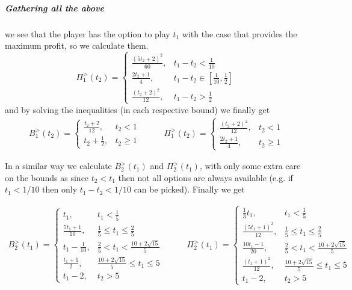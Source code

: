 \documentclass[a4paper,11pt]{article}
\begin{document}
\subparagraph{Gathering all the above} we see that the player has the option to play $t_1$ with the case that provides the maximum profit, so we calculate them.
\[
	\Pi_1^>(t_2) =
	\begin{cases}
		\frac{(5 t_2 + 2)^2}{60}, & t_1 - t_2 < \frac1{10} \\
		\frac{2 t_2 + 1}4, & t_1 - t_2 \in \left[\frac1{10}, \frac12\right] \\
		\frac{(t_2 + 2)^2}{12}, & t_1 - t_2 > \frac12
	\end{cases}
\]
and by solving the inequalities (in each respective bound) we finally get
\begin{equation*}
	\begin{aligned}
		B_1^>(t_2) =
		\begin{cases}
			\frac{t_2 + 2}{12}, & t_2 < 1 \\
			t_2 + \frac12, & t_2 \ge 1
		\end{cases}
	\end{aligned}
	\qquad
	\begin{aligned}
		\Pi_1^>(t_2) =
		\begin{cases}
			\frac{(t_2 + 2)^2}{12}, & t_2 < 1 \\
			\frac{2 t_2 + 1}4, & t_2 \ge 1
		\end{cases}
	\end{aligned}
\end{equation*}

In a similar way we calculate $B_2^>(t_1)$ and $\Pi_2^>(t_1)$, with only some extra care on the bounds as since $t_2 < t_1$ then not all options are always available (e.g. if $t_1 < 1/10$ then only $t_1 - t_2 < 1/10$ can be picked).
Finally we get

\begin{equation*}
	\begin{aligned}
		B_2^>(t_1) =
		\begin{cases}
			t_1, & t_1 < \frac15 \\
			\frac{5 t_1 + 1}{10}, & \frac15 \le t_1 \le \frac25 \\
			t_1 - \frac1{10}, & \frac25 < t_1 < \frac{10 + 2 \sqrt{15}}5 \\
			\frac{t_1 + 1}2, & \frac{10 + 2 \sqrt{15}}5 \le t_1 \le 5 \\
			t_1 - 2, & t_2 > 5
		\end{cases}
	\end{aligned}
	\qquad
	\begin{aligned}
		\Pi_2^>(t_1) =
		\begin{cases}
			\frac13 t_1, & t_1 < \frac15 \\
			\frac{(5 t_1 + 1)^2}{12}, & \frac15 \le t_1 \le \frac25 \\
			\frac{10 t_1 - 1}{20}, & \frac25 < t_1 < \frac{10 + 2 \sqrt{15}}5 \\
			\frac{(t_1 + 1)^2}{12}, & \frac{10 + 2 \sqrt{15}}5 \le t_1 \le 5 \\
			t_1 - 2, & t_2 > 5
		\end{cases}
	\end{aligned}
\end{equation*}
\end{document}
